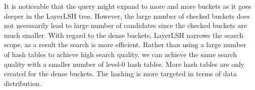 It is noticeable that the query might expand to more and more buckets as it goes deeper in the LayerLSH tree. However, the large number of checked buckets does not necessarily lead to large number of candidates since the checked buckets are much smaller. With regard to the dense buckets, LayerLSH narrows the search scope, as a result the search is more efficient. Rather than using a large number of hash tables to achieve high search quality, we can achieve the same search quality with a smaller number of level-0 hash tables. More hash tables are only created for the dense buckets. The hashing is more targeted in terms of data distribution.

